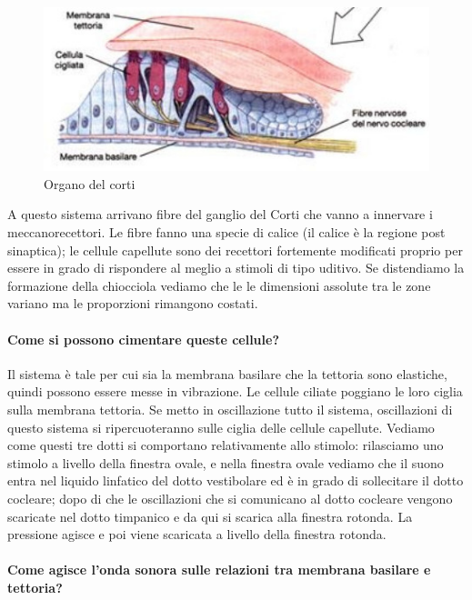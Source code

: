 \documentclass[a4paper,12pt]{article}
\begin{document}
\begin{figure}[H]
\centering
\includegraphics[scale=0.45]{immagine/corti1.jpg}
\caption{Organo del corti}
\end{figure}

A questo sistema arrivano fibre del ganglio del Corti che vanno a innervare i meccanorecettori. Le fibre fanno una specie di calice (il calice è la regione post sinaptica); le cellule capellute sono dei recettori fortemente modificati proprio per essere in grado di rispondere al meglio a stimoli di tipo uditivo. Se distendiamo la formazione della chiocciola vediamo che le le dimensioni assolute tra le zone variano ma le proporzioni rimangono costati. 

\paragraph{Come si possono cimentare queste cellule?}

Il sistema è tale per cui sia la membrana basilare che la tettoria sono elastiche, quindi possono essere messe in vibrazione. Le cellule ciliate poggiano le loro ciglia sulla membrana tettoria. Se metto in oscillazione tutto il sistema, oscillazioni di questo sistema si ripercuoteranno sulle ciglia delle cellule capellute. Vediamo come questi tre dotti si comportano relativamente allo stimolo: rilasciamo uno stimolo a livello della finestra ovale, e nella finestra ovale vediamo che il suono entra nel liquido linfatico del dotto vestibolare ed è in grado di sollecitare il dotto cocleare; dopo di che le oscillazioni che si comunicano al dotto cocleare vengono scaricate nel dotto timpanico e da qui si scarica alla finestra rotonda. La pressione agisce e poi viene scaricata a livello della finestra rotonda.

\paragraph{Come agisce l'onda sonora sulle relazioni tra membrana basilare e tettoria?}
\end{document}
